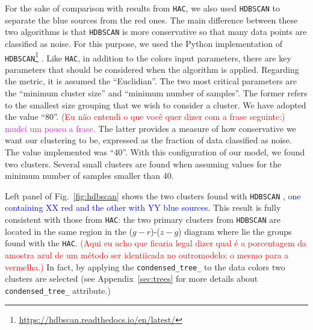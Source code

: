 \documentclass[fleqn,usenatbib]{mnras}
\newcommand{\rlopes}[1]{\textcolor{blue}{#1}}
\newcommand{\comment}[1]{\textcolor{red}{#1}}
\newcommand{\luis}[1]{\textcolor{magenta}{#1}}
\begin{document}
For the sake of comparison with results from \texttt{HAC}, we also used \texttt{HDBSCAN} to separate the blue sources from the red ones. 
The main difference between these two algorithms is that  \texttt{HDBSCAN}
is more conservative so that many data points are classified as noise.
For this purpose, we used the Python implementation of \texttt{HDBSCAN}\footnote{\url{https://hdbscan.readthedocs.io/en/latest/}}
\citep{McInnes:2017}. Like \texttt{HAC}, in addition to the colors input
parameters,  there are key parameters that should be considered  when the algorithm is
applied. 
Regarding the metric, it is assumed the ``Euclidian''.
The two most critical parameters 
are the ``minimum cluster size'' and ``minimum number
of samples''. The former refers to the smallest size grouping that we wish to consider a cluster.
We have adopted the value ``80''. 
\comment{(Eu não entendi o que você quer dizer com a frase seguinte:)} \luis{mudei um pouco a frase.}
The latter provides a measure of how conservative we want 
our clustering to be, expressed as the fraction of data classified as noise.
The value implemented was ``40''. With this configuration 
of our model, 
we found
two 
clusters. 
Several small clusters are found when assuming values for the minimum number of samples smaller than 40.

Left panel of Fig.~\ref{fig:hdbscan} 
shows 
the two 
clusters found with \texttt{HDBSCAN}
\rlopes{, one containing XX red and the other with YY blue sources}. 
This result is fully consistent with those from \texttt{HAC}: the two primary clusters from \texttt{HDBSCAN} are located in the same region in
the ($g - r$)-($z - g$) diagram where lie the groups found with the \texttt{HAC}.
\comment{(Aqui eu acho que ficaria legal dizer qual é a porcentagem da amostra azul de um método ser identiicada no outromodelo; o mesmo para a vermelha.)}
In fact, by applying the
\texttt{condensed\_tree\_} to the data colors two clusters are selected 
(see Appendix~\ref{sec:trees} for more details about \texttt{condensed\_tree\_} attribute.)
\end{document}
